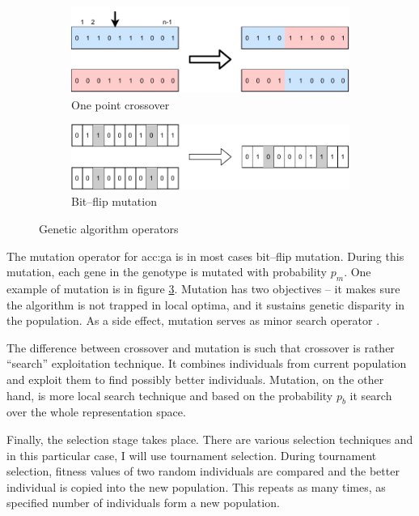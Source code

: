 \begin{figure}
    \begin{subfigure}[b]{0.4\textwidth}
        \includegraphics[width=\textwidth]{img/master_onepointcrossover.pdf}
        \caption{One point crossover}
        \label{fig:gaonepointcrossover}
    \end{subfigure}
    \hfill
    \begin{subfigure}[b]{0.4\textwidth}
        \includegraphics[width=\textwidth]{img/master_bitflipmutation.pdf}
        \caption{Bit--flip mutation}
        \label{fig:bitflipmutation}
    \end{subfigure}
    \caption{Genetic algorithm operators}
\end{figure}

The mutation operator for \acrshort{acc:ga} is in most cases bit--flip mutation. During this mutation, each gene in the genotype is mutated with probability $p_m$. One example of mutation is in figure \ref{fig:bitflipmutation}. Mutation has two objectives -- it makes sure the algorithm is not trapped in local optima, and it sustains genetic disparity in the population. As a side effect, mutation serves as minor search operator \citep{IntroToGA}.

The difference between crossover and mutation is such that crossover is rather \enquote{search} exploitation technique. It combines individuals from current population and exploit them to find possibly better individuals. Mutation, on the other hand, is more local search technique and based on the probability $p_b$ it search over the whole representation space.

Finally, the selection stage takes place. There are various selection techniques and in this particular case, I will use tournament selection. During tournament selection, fitness values of two random individuals are compared and the better individual is copied into the new population. This repeats as many times, as specified number of individuals form a new population.

